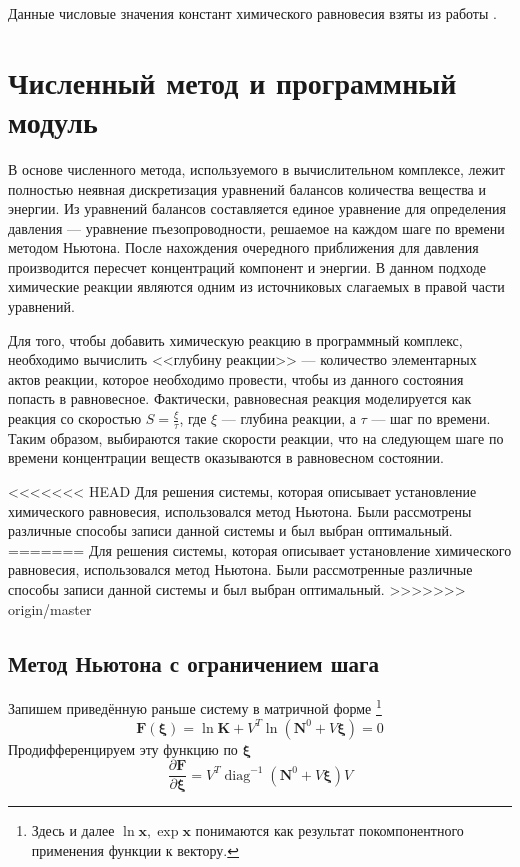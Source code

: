 \documentclass[14pt,a4paper]{extarticle}
\newcommand{\diag}{\operatorname{diag}}
\renewcommand{\vec}[1]{\boldsymbol{\mathbf{#1}}}
\begin{document}
Данные числовые значения констант химического равновесия взяты из работы \cite{vostrikov}.

\clearpage
\section{Численный метод и программный модуль}

В основе численного метода, используемого в вычислительном комплексе, лежит полностью неявная дискретизация уравнений балансов количества вещества и энергии. Из уравнений балансов составляется единое уравнение для определения давления --- уравнение пъезопроводности, решаемое на каждом шаге по времени методом Ньютона. После нахождения очередного приближения для давления производится пересчет концентраций компонент и энергии. В данном подходе химические реакции являются одним из источниковых слагаемых в правой части уравнений.

Для того, чтобы добавить химическую реакцию в программный комплекс, необходимо вычислить <<глубину реакции>> --- количество элементарных актов реакции, которое необходимо провести, чтобы из данного состояния попасть в равновесное. Фактически, равновесная реакция моделируется как реакция со скоростью $S = \frac{\xi}{\tau}$, где $\xi$ --- глубина реакции, а $\tau$ --- шаг по времени. Таким образом, выбираются такие скорости реакции, что на следующем шаге по времени концентрации веществ оказываются в равновесном состоянии.

<<<<<<< HEAD
Для решения системы, которая описывает установление химического равновесия, использовался метод Ньютона. Были рассмотрены различные способы записи данной системы и был выбран оптимальный.
=======
Для решения системы, которая описывает установление химического равновесия, использовался метод Ньютона. Были рассмотренные различные способы записи данной системы и был выбран оптимальный.
>>>>>>> origin/master

\subsection{Метод Ньютона с ограничением шага}

Запишем приведённую раньше систему в матричной форме
\footnote{Здесь и далее $\ln \vec x, \exp \vec x$ понимаются как результат покомпонентного применения функции к вектору.}
$$\vec{F}(\vec \xi) = \ln{\vec{K}} + V^T \ln{(\vec{N}^0 + V\vec \xi)} = 0$$
Продифференцируем эту функцию по $\vec \xi$
$$\frac{\partial \vec{F}}{\partial{\vec{\xi}}} = V^T\diag^{-1}(\vec{N}^0 + V\vec{\xi})V$$
\end{document}
